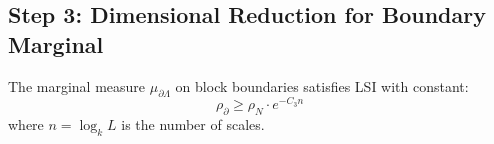 \subsection{Step 3: Dimensional Reduction for Boundary Marginal}

\begin{theorem}
\label{thm:boundary-marginal}
The marginal measure $\mu_{\partial \Lambda}$ on block boundaries satisfies LSI with 
constant:
\begin{equation}
\rho_{\partial} \geq \rho_N \cdot e^{-C_3 n}
\end{equation}
where $n = \log_k L$ is the number of scales.
\end{theorem}

